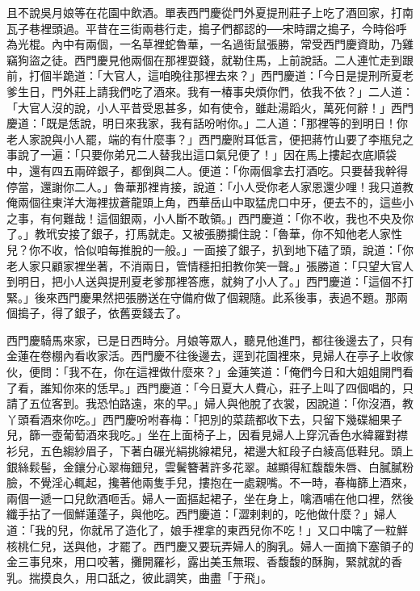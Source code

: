 \begin{showcontents}{}
且不說吳月娘等在花園中飲酒。單表西門慶從門外夏提刑莊子上吃了酒回家，打南瓦子巷裡頭過。平昔在三街兩巷行走，搗子們都認的──宋時謂之搗子，今時俗呼為光棍。內中有兩個，一名草裡蛇魯華，一名過街鼠張勝，常受西門慶資助，乃雞竊狗盜之徒。西門慶見他兩個在那裡耍錢，就勒住馬，上前說話。二人連忙走到跟前，打個半跪道：「大官人，這咱晚往那裡去來？」西門慶道：「今日是提刑所夏老爹生日，門外莊上請我們吃了酒來。我有一椿事央煩你們，依我不依？」二人道：「大官人沒的說，小人平昔受恩甚多，如有使令，雖赴湯蹈火，萬死何辭！」西門慶道：「既是恁說，明日來我家，我有話吩咐你。」二人道：「那裡等的到明日！你老人家說與小人罷，端的有什麼事？」西門慶附耳低言，便把蔣竹山要了李瓶兒之事說了一遍：「只要你弟兄二人替我出這口氣兒便了！」因在馬上摟起衣底順袋中，還有四五兩碎銀子，都倒與二人。便道：「你兩個拿去打酒吃。只要替我幹得停當，還謝你二人。」魯華那裡肯接，說道：「小人受你老人家恩還少哩！我只道教俺兩個往東洋大海裡拔蒼龍頭上角，西華岳山中取猛虎口中牙，便去不的，這些小之事，有何難哉！這個銀兩，小人斷不敢領。」西門慶道：「你不收，我也不央及你了。」教玳安接了銀子，打馬就走。又被張勝攔住說：「魯華，你不知他老人家性兒？你不收，恰似咱每推脫的一般。」一面接了銀子，扒到地下磕了頭，說道：「你老人家只顧家裡坐著，不消兩日，管情穩抇抇教你笑一聲。」張勝道：「只望大官人到明日，把小人送與提刑夏老爹那裡答應，就夠了小人了。」西門慶道：「這個不打緊。」後來西門慶果然把張勝送在守備府做了個親隨。此系後事，表過不題。那兩個搗子，得了銀子，依舊耍錢去了。

西門慶騎馬來家，已是日西時分。月娘等眾人，聽見他進門，都往後邊去了，只有金蓮在卷棚內看收家活。西門慶不往後邊去，逕到花園裡來，見婦人在亭子上收傢伙，便問：「我不在，你在這裡做什麼來？」金蓮笑道：「俺們今日和大姐姐開門看了看，誰知你來的恁早。」西門慶道：「今日夏大人費心，莊子上叫了四個唱的，只請了五位客到。我恐怕路遠，來的早。」婦人與他脫了衣裳，因說道：「你沒酒，教丫頭看酒來你吃。」西門慶吩咐春梅：「把別的菜蔬都收下去，只留下幾碟細果子兒，篩一壺葡萄酒來我吃。」坐在上面椅子上，因看見婦人上穿沉香色水緯羅對襟衫兒，五色縐紗眉子，下著白碾光絹挑線裙兒，裙邊大紅段子白綾高低鞋兒。頭上銀絲鬏髻，金鑲分心翠梅鈿兒，雲鬢簪著許多花翠。越顯得紅馥馥朱唇、白膩膩粉臉，不覺淫心輒起，攙著他兩隻手兒，摟抱在一處親嘴。不一時，春梅篩上酒來，兩個一遞一口兒飲酒咂舌。婦人一面摳起裙子，坐在身上，噙酒哺在他口裡，然後纖手拈了一個鮮蓮蓬子，與他吃。西門慶道：「澀剌剌的，吃他做什麼？」婦人道：「我的兒，你就吊了造化了，娘手裡拿的東西兒你不吃！」又口中噙了一粒鮮核桃仁兒，送與他，才罷了。西門慶又要玩弄婦人的胸乳。婦人一面摘下塞領子的金三事兒來，用口咬著，攤開羅衫，露出美玉無瑕、香馥馥的酥胸，緊就就的香乳。揣摸良久，用口舐之，彼此調笑，曲盡「于飛」。


\end{showcontents}
